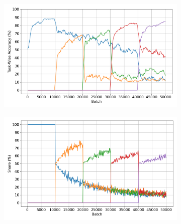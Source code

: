 \documentclass[oneside]{ctuthesis}
\begin{document}
\begin{figure}[t]
    \centering
    \begin{subfigure}[t]{0.48\linewidth}
        \centering
        \includegraphics[width=\linewidth]{figures/CIFAR10_DISJOINT_RESERVOIR_accuracy.png}
    \end{subfigure}
    \hfill
    \begin{subfigure}[t]{0.48\linewidth}
        \centering
        \includegraphics[width=\linewidth]{figures/CIFAR10_DISJOINT_RESERVOIR_shares.png}
    \end{subfigure}


\end{figure}
\end{document}

